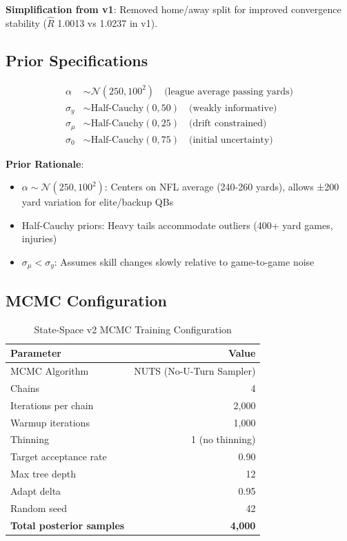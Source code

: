\textbf{Simplification from v1}: Removed home/away split for improved convergence stability ($\hat{R}$ 1.0013 vs 1.0237 in v1).

\subsection{Prior Specifications}

\begin{align}
\alpha &\sim \mathcal{N}(250, 100^2) \quad \text{(league average passing yards)} \\
\sigma_y &\sim \text{Half-Cauchy}(0, 50) \quad \text{(weakly informative)} \\
\sigma_\mu &\sim \text{Half-Cauchy}(0, 25) \quad \text{(drift constrained)} \\
\sigma_0 &\sim \text{Half-Cauchy}(0, 75) \quad \text{(initial uncertainty)}
\label{eq:state-space-priors}
\end{align}

\textbf{Prior Rationale}:
\begin{itemize}
\item $\alpha \sim \mathcal{N}(250, 100^2)$: Centers on NFL average (240-260 yards), allows ±200 yard variation for elite/backup QBs
\item Half-Cauchy priors: Heavy tails accommodate outliers (400+ yard games, injuries)
\item $\sigma_\mu < \sigma_y$: Assumes skill changes slowly relative to game-to-game noise
\end{itemize}

\subsection{MCMC Configuration}

\begin{table}[htbp]
\centering
\caption{State-Space v2 MCMC Training Configuration}
\label{tab:state-space-mcmc}
\begin{tabular}{lr}
\toprule
\textbf{Parameter} & \textbf{Value} \\
\midrule
MCMC Algorithm & NUTS (No-U-Turn Sampler) \\
Chains & 4 \\
Iterations per chain & 2,000 \\
Warmup iterations & 1,000 \\
Thinning & 1 (no thinning) \\
Target acceptance rate & 0.90 \\
Max tree depth & 12 \\
Adapt delta & 0.95 \\
Random seed & 42 \\
\midrule
\textbf{Total posterior samples} & \textbf{4,000} \\
\bottomrule
\end{tabular}
\end{table}

